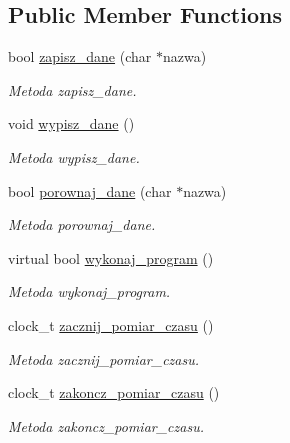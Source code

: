\subsection*{Public Member Functions}
\begin{DoxyCompactItemize}
\item 
bool \hyperlink{class_program_aaef7fcaf64830eb231cbb9e887d705af}{zapisz\-\_\-dane} (char $\ast$nazwa)
\begin{DoxyCompactList}\small\item\em Metoda zapisz\-\_\-dane. \end{DoxyCompactList}\item 
void \hyperlink{class_program_a060ea3afebf696152d50135d20856e5a}{wypisz\-\_\-dane} ()
\begin{DoxyCompactList}\small\item\em Metoda wypisz\-\_\-dane. \end{DoxyCompactList}\item 
bool \hyperlink{class_program_ab5441e0e8ecd02ffeada4d77aaad2726}{porownaj\-\_\-dane} (char $\ast$nazwa)
\begin{DoxyCompactList}\small\item\em Metoda porownaj\-\_\-dane. \end{DoxyCompactList}\item 
virtual bool \hyperlink{class_program_ac396401ba5cade863d0e6acb727bec4e}{wykonaj\-\_\-program} ()
\begin{DoxyCompactList}\small\item\em Metoda wykonaj\-\_\-program. \end{DoxyCompactList}\item 
clock\-\_\-t \hyperlink{class_program_ab68c69977637eb8cc05a57e176a21986}{zacznij\-\_\-pomiar\-\_\-czasu} ()
\begin{DoxyCompactList}\small\item\em Metoda zacznij\-\_\-pomiar\-\_\-czasu. \end{DoxyCompactList}\item 
clock\-\_\-t \hyperlink{class_program_a3515568f8df7224bfd8fd8b7b76ab0ba}{zakoncz\-\_\-pomiar\-\_\-czasu} ()
\begin{DoxyCompactList}\small\item\em Metoda zakoncz\-\_\-pomiar\-\_\-czasu. \end{DoxyCompactList}\end{DoxyCompactItemize}
